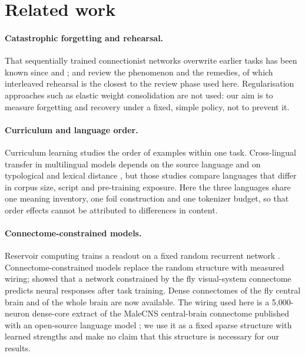 \documentclass[preprint,12pt,authoryear]{elsarticle}
\begin{document}
\section{Related work}

\paragraph{Catastrophic forgetting and rehearsal.} That sequentially trained connectionist networks overwrite earlier tasks has been known since \citet{mccloskey1989} and \citet{ratcliff1990}; \citet{french1999} and \citet{parisi2019} review the phenomenon and the remedies, of which interleaved rehearsal \citep{robins1995} is the closest to the review phase used here. Regularisation approaches such as elastic weight consolidation \citep{kirkpatrick2017} are not used: our aim is to measure forgetting and recovery under a fixed, simple policy, not to prevent it.

\paragraph{Curriculum and language order.} Curriculum learning \citep{bengio2009} studies the order of examples within one task. Cross-lingual transfer in multilingual models depends on the source language and on typological and lexical distance \citep{pires2019,lin2019,conneau2020}, but those studies compare languages that differ in corpus size, script and pre-training exposure. Here the three languages share one meaning inventory, one foil construction and one tokenizer budget, so that order effects cannot be attributed to differences in content.

\paragraph{Connectome-constrained models.} Reservoir computing trains a readout on a fixed random recurrent network \citep{jaeger2001,maass2002}. Connectome-constrained models replace the random structure with measured wiring; \citet{lappalainen2024} showed that a network constrained by the fly visual-system connectome predicts neural responses after task training. Dense connectomes of the fly central brain \citep{scheffer2020} and of the whole brain \citep{dorkenwald2024} are now available. The wiring used here is a 5{,}000-neuron dense-core extract of the MaleCNS central-brain connectome \citep{berg2026malecns} published with an open-source language model \citep{flygpt}; we use it as a fixed sparse structure with learned strengths and make no claim that this structure is necessary for our results.
\end{document}
